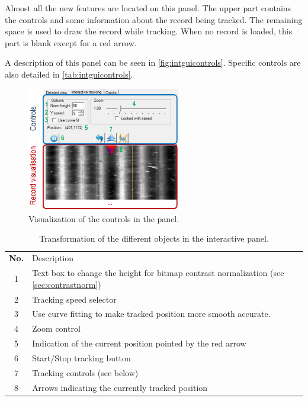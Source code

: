 Almost all the new features are located on this panel. The upper part contains the controls and some information about the record being tracked. The remaining space is used to draw the record while tracking. When no record is loaded, this part is blank except for a red arrow.

A description of this panel can be seen in \autoref{fig:intguicontrols}. Specific controls are also detailed in \autoref{tab:intguicontrols}.

\begin{figure}[!ht]
\centering
\includegraphics[width=0.6\textwidth]{images/int-track-controls}
\caption{Visualization of the controls in the panel.}
\label{fig:intguicontrols}
\end{figure}

\begin{table}[h!]
\begin{center}
\tabulinesep=3pt
\begin{tabu} to 0.7\textwidth {| c | X[m] |} %
    \everyrow{\hline}
    \hline
    \rowfont[c] \bfseries
        No. & Description \\
        1 & Text box to change the height for bitmap contrast normalization (see \autoref{sec:contrastnorm}) \\
        2 & Tracking speed selector \\
        3 & Use curve fitting to make tracked position more smooth accurate. \\
        4 & Zoom control \\
        5 & Indication of the current position pointed by the red arrow \\
        6 & Start/Stop tracking button \\
        7 & Tracking controls (see below) \\
        8 & Arrows indicating the currently tracked position \\
\end{tabu}
\end{center}
\caption{Transformation of the different objects in the interactive panel.}
\label{tab:intguicontrols}
\end{table}

